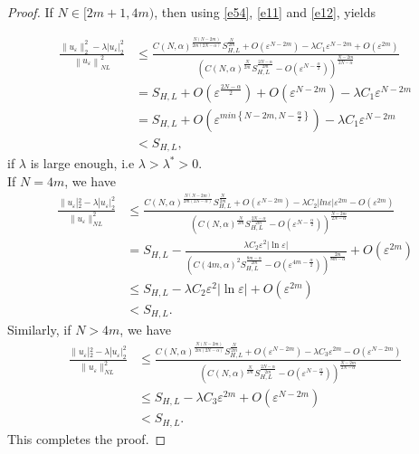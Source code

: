 \documentclass[reqno]{amsart}
\newcommand{\la} {\lambda}
\newcommand{\eps}{\varepsilon}
\newcommand{\al} {\alpha}
\numberwithin{theorem}{section} \numberwithin{equation}{section}
\begin{document}
\begin{proof}
If $N \in[2m+1, 4m)$, then using \eqref{e54}, \eqref{e11} and \eqref{e12}, yields

\begin{align*}
\frac{\|u_{\eps}\|_2^2-\la\left|u_{\eps}\right|_2^2}{\left\|u_{\eps}\right\|_{N L}^2} & \leq \frac{C(N, \al)^{\frac{N(N-2m)}{2m(2N- \al)}} S_{H, L}^{\frac{N}{2m}}+ O\left(\eps^{N-2m}\right)-\la C_1 \eps^{N-2m} +O\left(\eps^{2m} \right)}{\left(C(N, \al)^{\frac{N}{2m}} S_{H, L}^{\frac{2N-\al}{2m}}-O\left(\eps^{N-\frac{\al}{2}}\right)\right)^{\frac{N-2m}{2N-\al}}} \\
&=S_{H, L} +O\left(\eps^{\frac{2N-\al}{2}}\right)+O\left(\eps^{N-2m}\right) -\la C_1 \eps^{N-2m} \\
&=S_{H, L} +O\left(\eps^{min\left\{N-2m, N-{\frac{\al}{2}}\right\}}\right) -\la C_1 \eps^{N-2m}\\ 
&<S_{H, L},
\end{align*}
if $\la$ is large enough, i.e $\la>\la^*>0$.\\
If $N=4m$, we have
\begin{align*}
\frac{\|u_{\eps}|_2^2-\la|u_{\eps}|_2^2}{\|u_{\eps}\|_{N L}^2} & \leq\frac{C(N, \al)^{\frac{N(N-2m)}{2m(2N-\al)}} S_{H, L}^{\frac{N}{2m}}+O\left(\eps^{N-2m}\right)-\la C_2 |ln{\eps}| \eps^{2m} -O\left(\eps^{2m}\right)}{\left(C(N, \al)^{\frac{N}{2m}} S_{H, L}^{\frac{2N-\al}{2m}}-O\left(\eps^{N-\frac{\al}{2}}\right)\right)^{\frac{N-2m}{2N-\al}}} \\
& =S_{H, L}-\frac{\la C_2 \eps^2|\ln \eps|}{\left(C(4m, \al)^2 S_{H, L}^{\frac{8m-\al}{2m}}-O\left(\eps^{4m-\frac{\al}{2}}\right)\right)^{\frac{2m}{8m-\al}}}+O\left(\eps^{2m}\right) \\
& \leq S_{H, L}-\la C_2 \eps^2|\ln \eps|+O\left(\eps^{2m}\right) \\
& <S_{H, L}.
\end{align*}
Similarly, if $N> 4m$, we have
\begin{align*}
\frac{\|u_{\eps}|_2^2-\la|u_{\eps}|_2^2}{\|u_{\eps}\|_{N L}^2} & \leq\frac{C(N, \al)^{\frac{N(N-2m)}{2m(2N-\al)}} S_{H, L}^{\frac{N}{2m}}+O\left(\eps^{N-2m}\right)-\la C_3\eps^{2m} -O\left(\eps^{N-2m}\right)}{\left(C(N, \al)^{\frac{N}{2m}} S_{H, L}^{\frac{2N-\al}{2m}}-O\left(\eps^{N-\frac{\al}{2}}\right)\right)^{\frac{N-2m}{2N-\al}}} \\
& \leq S_{H, L}-\la C_3 \eps^{2m} +O\left(\eps^{N-2m}\right)\\
&<S_{H, L}.
\end{align*}
This completes the proof.
\end{proof}
\end{document}
